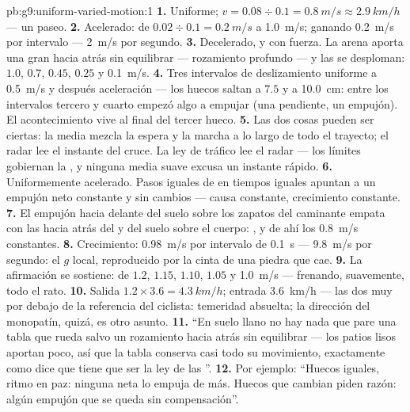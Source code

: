 \begin{solution}{pb:g9:uniform-varied-motion:1}
\textbf{1.} Uniforme; $v = 0.08 \div 0.1 = \qty{0.8}{m/s} \approx
\qty{2.9}{km/h}$ --- un paseo.
\textbf{2.} Acelerado: de $0.02 \div 0.1 = \qty{0.2}{m/s}$ a
\qty{1.0}{m/s}; ganando \qty{0.2}{m/s} por intervalo --- \qty{2}{m/s}
por segundo.
\textbf{3.} Decelerado, y con fuerza. La arena aporta una gran
 hacia atrás sin equilibrar --- rozamiento profundo --- y
las  se desploman: $1.0$, $0.7$, $0.45$, $0.25$ y
\qty{0.1}{m/s}.
\textbf{4.} Tres intervalos de deslizamiento uniforme a
\qty{0.5}{m/s} y después aceleración --- los huecos saltan a $7.5$ y a
\qty{10.0}{cm}: entre los intervalos tercero y cuarto empezó algo a
empujar (una pendiente, un empujón). El acontecimiento vive al final
del tercer hueco.
\textbf{5.} Las dos cosas pueden ser ciertas: la media mezcla la espera
y la marcha a lo largo de todo el trayecto; el radar lee el instante
del cruce. La ley de tráfico lee el radar --- los límites gobiernan la
, y ninguna media suave excusa un instante
rápido.
\textbf{6.} Uniformemente acelerado. Pasos iguales de  en
tiempos iguales apuntan a un empujón neto constante y sin cambios ---
causa constante, crecimiento constante.
\textbf{7.} El empujón hacia delante del suelo sobre los zapatos del
caminante empata con las  hacia atrás del
 y del suelo sobre el cuerpo: , y de ahí los
\qty{0.8}{m/s} constantes.
\textbf{8.} Crecimiento: \qty{0.98}{m/s} por intervalo de
\qty{0.1}{s} --- \qty{9.8}{m/s} por segundo: el $g$ local, reproducido
por la cinta de una piedra que cae.
\textbf{9.} La afirmación se sostiene:  de $1.2$,
$1.15$, $1.10$, $1.05$ y \qty{1.0}{m/s} --- frenando, suavemente, todo
el rato.
\textbf{10.} Salida $1.2 \times 3.6 = \qty{4.3}{km/h}$; entrada
\qty{3.6}{km/h} --- las dos muy por debajo de la referencia del
ciclista: temeridad absuelta; la dirección del monopatín, quizá, es
otro asunto.
\textbf{11.} ``En suelo llano no hay nada que pare una tabla que rueda
salvo un rozamiento hacia atrás sin equilibrar --- los patios lisos
aportan poco, así que la tabla conserva casi todo su movimiento,
exactamente como dice que tiene que ser la ley de las
 ''.
\textbf{12.} Por ejemplo: ``Huecos iguales, ritmo en paz: ninguna
 neta lo empuja de más. Huecos que cambian piden razón:
algún empujón que se queda sin compensación''.
\end{solution}
